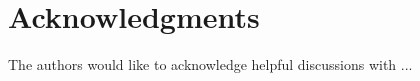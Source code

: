 \clearpage
\appendix

\section*{Acknowledgments}

The authors would like to acknowledge helpful discussions with ...

% 



% 
% 
% 
% 
% 
% 
% 
% 
% 
% 
% 
% 
% 
% 
% 
% 
% 
% 
% 
% 






